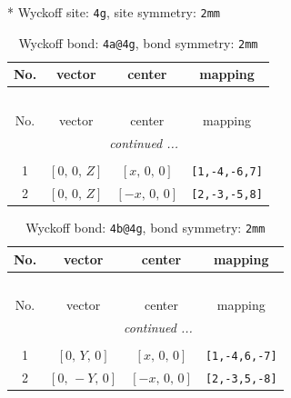 \documentclass[fleqn,8pt]{jsarticle}
\begin{document}
* Wyckoff site: {\tt 4g}, site symmetry: {\tt 2mm}
\renewcommand{\arraystretch}{1.2}
\begin{longtable}{cccc}
\caption{Wyckoff bond: {\tt 4a@4g}, bond symmetry: {\tt 2mm}}
 \\
 \hline \hline
No. & vector & center & mapping \\ \hline \endfirsthead

\multicolumn{3}{l}{\tablename\ \thetable{}} \\
 \hline \hline
No. & vector & center & mapping \\ \hline \endhead

 \hline \hline
\multicolumn{3}{r}{\footnotesize\it continued ...} \\ \endfoot

 \hline \hline
\multicolumn{3}{r}{} \\ \endlastfoot

1 & $\left[ 0,\, 0,\, Z \right]$ & $\left[ x,\, 0,\, 0 \right]$ & {\tt [1,-4,-6,7]} \\ \hline
2 & $\left[ 0,\, 0,\, Z \right]$ & $\left[ - x,\, 0,\, 0 \right]$ & {\tt [2,-3,-5,8]} \\
\end{longtable}
\renewcommand{\arraystretch}{1.2}
\begin{longtable}{cccc}
\caption{Wyckoff bond: {\tt 4b@4g}, bond symmetry: {\tt 2mm}}
 \\
 \hline \hline
No. & vector & center & mapping \\ \hline \endfirsthead

\multicolumn{3}{l}{\tablename\ \thetable{}} \\
 \hline \hline
No. & vector & center & mapping \\ \hline \endhead

 \hline \hline
\multicolumn{3}{r}{\footnotesize\it continued ...} \\ \endfoot

 \hline \hline
\multicolumn{3}{r}{} \\ \endlastfoot

1 & $\left[ 0,\, Y,\, 0 \right]$ & $\left[ x,\, 0,\, 0 \right]$ & {\tt [1,-4,6,-7]} \\ \hline
2 & $\left[ 0,\, - Y,\, 0 \right]$ & $\left[ - x,\, 0,\, 0 \right]$ & {\tt [2,-3,5,-8]} \\
\end{longtable}
\renewcommand{\arraystretch}{1.2}
\end{document}
